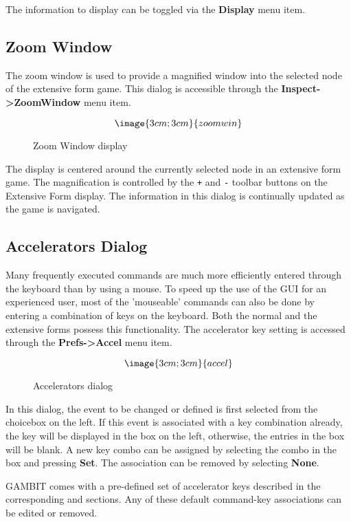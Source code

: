 The information to display can be toggled via the {\bf Display} menu
item.

\subsection{Zoom Window}\label{ZoomWindow}

The zoom window is used to provide a magnified window into the
selected node of the extensive form game.  This dialog is accessible
through the {\bf Inspect->ZoomWindow} menu item. 

\begin{figure}
$$\image{3cm;3cm}{zoomwin}$$
\caption{Zoom Window display}\label{fig_zoomwin}
\end{figure}

The display is centered around the currently selected node in an
extensive form game.  The magnification is controlled by the {\tt +}
and {\tt -} toolbar buttons on the Extensive Form display.  The
information in this dialog is continually updated as the game is
navigated.

\subsection{Accelerators Dialog}\label{AcceleratorSec}

Many frequently executed commands are much more efficiently entered
through the keyboard than by using a mouse.  To speed up the use of
the GUI for an experienced user, most of the 'mouseable' commands can
also be done by entering a combination of keys on the keyboard.  Both
the normal and the extensive forms possess this functionality.  The
accelerator key setting is accessed through the {\bf Prefs->Accel} 
menu item.

\begin{figure}
$$\image{3cm;3cm}{accel}$$
\caption{Accelerators dialog}\label{fig_accel}
\end{figure}

In this dialog, the event to be changed or defined is first selected
from the choicebox on the left.  If this event is associated with a
key combination already, the key will be displayed in the box on the
left, otherwise, the entries in the box will be blank.  A new key
combo can be assigned by selecting the combo in the box and pressing 
{\bf Set}.  The association can be removed by selecting {\bf None}.

GAMBIT comes with a pre-defined set of accelerator keys described in
the corresponding  and
 sections.  Any of these default
command-key associations can be edited or removed.  

